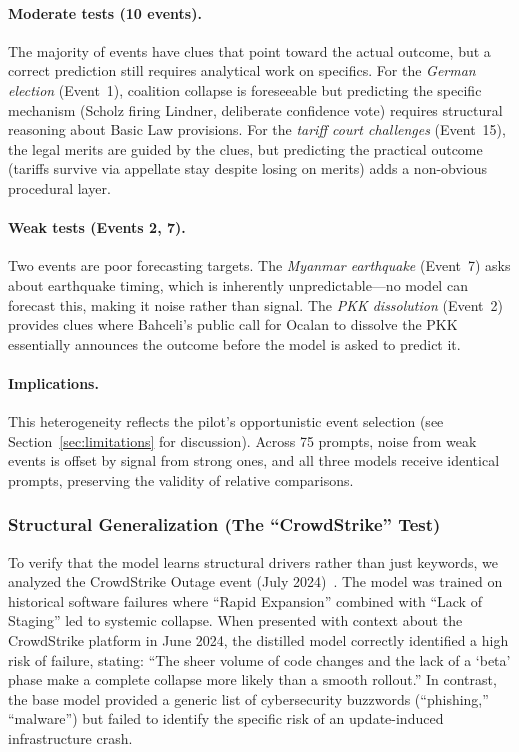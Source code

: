 \documentclass[11pt,a4paper]{article}
\begin{document}
\paragraph{Moderate tests (10 events).}
The majority of events have clues that point toward the actual outcome, but a correct prediction still requires analytical work on specifics. For the \textit{German election} (Event~1), coalition collapse is foreseeable but predicting the specific mechanism (Scholz firing Lindner, deliberate confidence vote) requires structural reasoning about Basic Law provisions. For the \textit{tariff court challenges} (Event~15), the legal merits are guided by the clues, but predicting the practical outcome (tariffs survive via appellate stay despite losing on merits) adds a non-obvious procedural layer.

\paragraph{Weak tests (Events 2, 7).}
Two events are poor forecasting targets. The \textit{Myanmar earthquake} (Event~7) asks about earthquake timing, which is inherently unpredictable---no model can forecast this, making it noise rather than signal. The \textit{PKK dissolution} (Event~2) provides clues where Bahceli's public call for Ocalan to dissolve the PKK essentially announces the outcome before the model is asked to predict it.

\paragraph{Implications.}
This heterogeneity reflects the pilot's opportunistic event selection (see Section~\ref{sec:limitations} for discussion). Across 75 prompts, noise from weak events is offset by signal from strong ones, and all three models receive identical prompts, preserving the validity of relative comparisons.

\subsubsection*{Structural Generalization (The ``CrowdStrike'' Test)}
To verify that the model learns structural drivers rather than just keywords, we analyzed the CrowdStrike Outage event (July 2024)~\cite{crowdstrike2024}. The model was trained on historical software failures where ``Rapid Expansion'' combined with ``Lack of Staging'' led to systemic collapse. When presented with context about the CrowdStrike platform in June 2024, the distilled model correctly identified a high risk of failure, stating: ``The sheer volume of code changes and the lack of a `beta' phase make a complete collapse more likely than a smooth rollout.'' In contrast, the base model provided a generic list of cybersecurity buzzwords (``phishing,'' ``malware'') but failed to identify the specific risk of an update-induced infrastructure crash.
\end{document}
